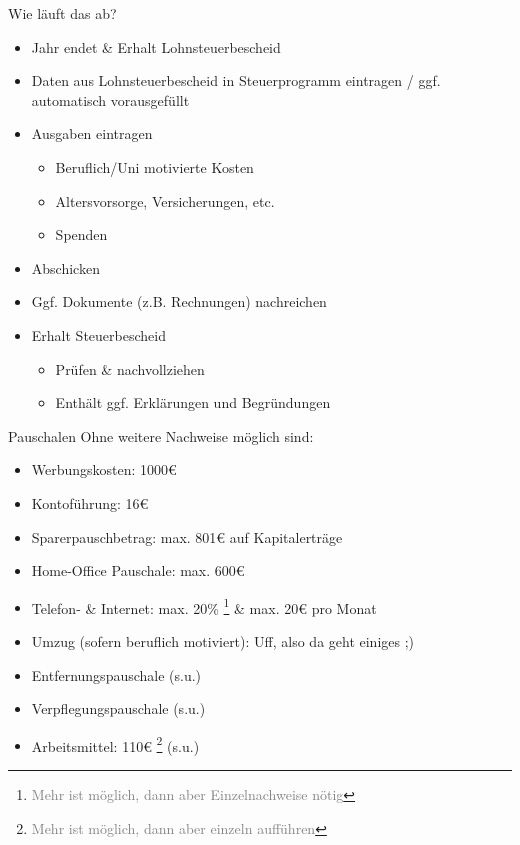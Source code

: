 \documentclass{beamer}
\let\oldfootnote\footnote
\renewcommand{\footnote}[1]
{%
	\oldfootnote
	{
		\tiny
		\textcolor{gray}{#1}
	}%
}
\begin{document}
			\begin{frame}{Wie läuft das ab?}
				\begin{itemize}
					\item Jahr endet \& Erhalt Lohnsteuerbescheid
					\item Daten aus Lohnsteuerbescheid in Steuerprogramm eintragen / ggf. automatisch vorausgefüllt
					\item Ausgaben eintragen
					\begin{itemize}
						\item Beruflich/Uni motivierte Kosten
						\item Altersvorsorge, Versicherungen, etc.
						\item Spenden
					\end{itemize}
					\item Abschicken
					\item Ggf. Dokumente (z.B. Rechnungen) nachreichen
					\item Erhalt Steuerbescheid
					\begin{itemize}
						\item Prüfen \& nachvollziehen
						\item Enthält ggf. Erklärungen und Begründungen
					\end{itemize}
				\end{itemize}
			\end{frame}
		
			\begin{frame}{Pauschalen}
				Ohne weitere Nachweise möglich sind:
				\begin{itemize}
					\item Werbungskosten: 1000€
					\item Kontoführung: 16€
					\item Sparerpauschbetrag: max. 801€ auf Kapitalerträge
					\item Home-Office Pauschale: max. 600€
					\item Telefon- \& Internet: max. 20\%\footnote{Mehr ist möglich, dann aber Einzelnachweise nötig} \& max. 20€ pro Monat
					\item Umzug (sofern beruflich motiviert): Uff, also da geht einiges ;)
					\item Entfernungspauschale (s.u.)
					\item Verpflegungspauschale (s.u.)
					\item Arbeitsmittel: 110€\footnote{Mehr ist möglich, dann aber einzeln aufführen} (s.u.)
				\end{itemize}
			\end{frame}
		
\end{document}
